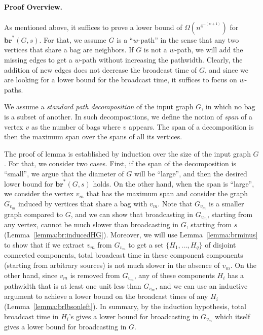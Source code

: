 \documentclass[letterpaper,11pt]{article}
\newcommand{\bropt}{{\boldsymbol{br}^*}}
\newcommand{\pwidth}{w}
\begin{document}
\paragraph{Proof Overview.}
As mentioned above, it suffices to prove a lower bound of $\Omega(n^{4^{-(w+1)}})$ for $\bropt(G,s)$. 
For that, we assume $G$ is a ``$\pwidth$-path'' in the sense that any two vertices that share a bag are neighbors. If $G$ is not a $\pwidth$-path, we will add the missing edges to get a $\pwidth$-path without increasing the pathwidth.
 Clearly, the addition of new edges does not decrease the broadcast time of $G$, and since we are looking for a lower bound for the broadcast time, it suffices to focus on $\pwidth$-paths.

We assume a \emph{standard path decomposition} of the input graph $G$, in which no bag is a subset of another. In such decompositions, we define the notion of \emph{span} of a vertex $v$ as the number of bags where $v$ appears. The span of a decomposition is then the maximum span over the spans of all its vertices. 

The proof of lemma is established by induction over the size of the input graph $G$. For that, we consider two cases. First, if the span of the decomposition is ``small'', we argue that the diameter of $G$ will be ``large'', and then the desired lower bound for $\bropt(G,s)$ holds.
On the other hand, when the span is ``large'', we consider the vertex $v_m$ that has the maximum span and  
consider the graph $G_{v_m}$ induced by vertices that share a bag with $v_m$. Note that $G_{v_m}$ is a smaller graph compared to $G$, and we can show that broadcasting in $G_{v_m}$, starting from any vertex, cannot be much slower than broadcasting in $G$, starting from $s$ (Lemma~\ref{lemma:br:inducedHG}). 
Moreover, we will use Lemma~\ref{lemma:brminus} to show that if we extract $v_m$ from $G_{v_m}$ to get a set $\{H_1,\ldots, H_q\}$ of disjoint connected components, total broadcast time in these component components (starting from arbitrary sources) is not much slower in the absence of $v_m$. On the other hand, since $v_m$ is removed from $G_{v_m}$, any of these components $H_i$ has a pathwidth that is at least one unit less than $G_{v_m}$, and we can use an inductive argument to achieve a lower bound on the broadcast times of any $H_i$ (Lemma~\ref{lemma:brlbsonleft}). In summary, by the induction hypothesis, total broadcast time in $H_i$'s gives a lower bound for broadcasting in $G_{v_m}$ which itself gives a lower bound for broadcasting in $G$. 
\end{document}
